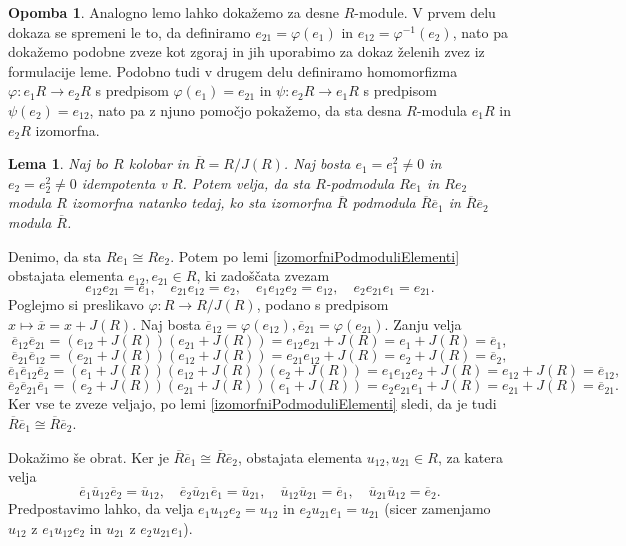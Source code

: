 \documentclass[a4paper, 12pt]{amsart}
\theoremstyle{definition} %
\newtheorem{opomba}[definicija]{Opomba}
\theoremstyle{plain} %
\newtheorem{lema}[definicija]{Lema}
\begin{document}
\begin{opomba} 
Analogno lemo lahko dokažemo za desne $R$-module. V prvem delu dokaza se spremeni le to, da definiramo $e_{21} = \varphi(e_1)$ in $e_{12} = \varphi^{-1} (e_2)$, nato pa dokažemo podobne zveze kot zgoraj in jih uporabimo za dokaz želenih zvez iz formulacije leme. Podobno tudi v drugem delu definiramo homomorfizma $\varphi:e_1 R \rightarrow e_2 R$ s predpisom $\varphi(e_1) = e_{21}$ in $\psi : e_2R \rightarrow e_1 R$ s predpisom $\psi(e_2) = e_{12}$, nato pa z  njuno pomočjo pokažemo, da sta desna $R$-modula $e_1 R$ in $e_2 R$ izomorfna.
\end{opomba}

\begin{lema}
\label{izomorfniPodmoduliKvocient}
Naj bo $R$ kolobar in $\overline{R} = R/J(R)$. Naj bosta $e_1 = e_1^2 \neq 0$ in $e_2  =  e_2^2 \neq 0 $ idempotenta v $R$. Potem velja, da sta $R$-podmodula $Re_1$ in $Re_2$ modula $R$ izomorfna natanko tedaj, ko sta izomorfna $\overline{R}$ podmodula $ \overline{R}\overline{e}_1$ in $ \overline{R} \overline{e}_2$ modula $\overline{R}$. 
\end{lema}

\proof
Denimo, da sta $R e_1 \cong Re_2$. Potem po lemi \ref{izomorfniPodmoduliElementi} obstajata elementa $e_{12}, e_{21} \in R$, ki zadoščata zvezam
$$
e_{12}e_{21} = e_1, \quad e_{21}e_{12} = e_2, \quad  e_1 e_{12} e_2 = e_{12}, \quad e_2 e_{21} e_1 = e_{21}.
$$
Poglejmo si preslikavo $\varphi: R\rightarrow R/J(R)$, podano s predpisom $x\mapsto \overline{x} = x+J(R)$. Naj bosta $\overline{e}_{12} = \varphi(e_{12}), \overline{e}_{21} = \varphi(e_{21})$. Zanju velja
$$
\overline{e}_{12} \overline{e}_{21} = (e_{12} + J(R))(e_{21} + J(R)) = e_{12} e_{21} + J(R) = e_1 + J(R) = \overline{e}_1,
$$
$$
\overline{e}_{21} \overline{e}_{12} = (e_{21} + J(R))(e_{12} + J(R)) = e_{21} e_{12} + J(R)  = e_2 + J(R) = \overline{e}_2,
$$
$$
\overline{e}_1 \overline{e}_{12} \overline{e}_2 = (e_1 + J(R)) (e_{12} + J(R)) (e_2 + J(R)) = e_1 e_{12} e_2 + J(R) = e_{12} + J(R) = \overline{e}_{12},
$$
$$
\overline{e}_2 \overline{e}_{21} \overline{e}_1 = (e_2 + J(R)) (e_{21} + J(R)) (e_1 + J(R)) = e_2 e_{21} e_1 + J(R) = e_{21} + J(R) = \overline{e}_{21}.
$$
Ker vse te zveze veljajo, po lemi \ref{izomorfniPodmoduliElementi} sledi, da je tudi $\overline{R} \overline{e}_1 \cong \overline{R}\overline{e}_2$.

Dokažimo še obrat. Ker je $\overline{R}\overline{e}_1 \cong \overline{R}\overline{e}_2$, obstajata elementa $u_{12},u_{21} \in R$, za katera velja 
$$
\overline{e}_1 \overline{u}_{12}\overline{e}_2 = \overline{u}_{12}, \quad \overline{e}_2 \overline{u}_{21} \overline{e}_1 = \overline{u}_{21}, \quad \overline{u}_{12}\overline{u}_{21} = \overline{e}_1, \quad \overline{u}_{21} \overline{u}_{12} = \overline{e}_2.
$$
Predpostavimo lahko, da velja $e_1 u_{12} e_2 = u_{12} $ in $e_2 u_{21} e_1 = u_{21}$ (sicer zamenjamo $u_{12}$ z $e_1 u_{12} e_2$ in $u_{21}$ z $e_2 u_{21} e_1$).
\end{document}
